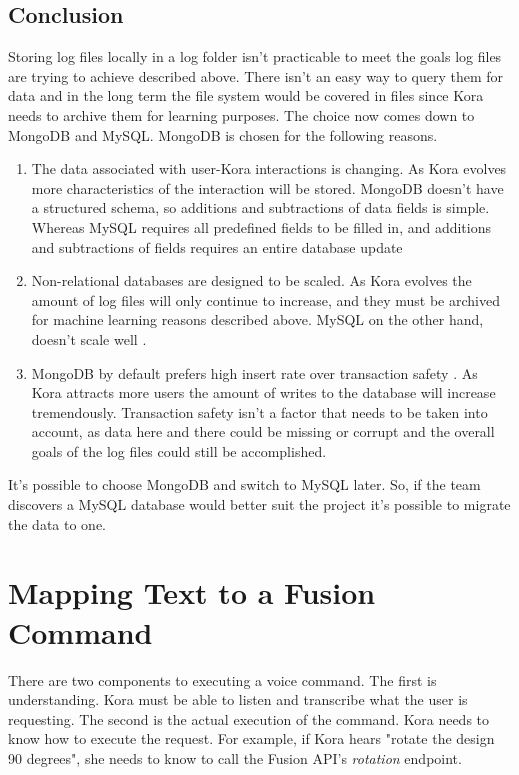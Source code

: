\documentclass[onecolumn, draftclsnofoot,10pt, compsoc]{IEEEtran}
\begin{document}
		\subsection{Conclusion}
			Storing log files locally in a log folder isn't practicable to meet the goals log files are trying to achieve described above.
			There isn't an easy way to query them for data and in the long term the file system would be covered in files since Kora needs to archive them for learning purposes.
			The choice now comes down to MongoDB and MySQL.
			MongoDB is chosen for the following reasons.
			\begin{enumerate}
				\item{
					The data associated with user-Kora interactions is changing.
					As Kora evolves more characteristics of the interaction will be stored.
					MongoDB doesn't have a structured schema, so additions and subtractions of data fields is simple.
					Whereas MySQL requires all predefined fields to be filled in, and additions and subtractions of fields requires an entire database update}
				\item{
					Non-relational databases are designed to be scaled.
					As Kora evolves the amount of log files will only continue to increase, and they must be archived for machine learning reasons described above. 
					MySQL on the other hand, doesn't scale well \cite{SQLvsNoSQLsitepoint}.}
				\item{
					MongoDB by default prefers high insert rate over transaction safety \cite{SQLvsNoSQLupwork}.
					As Kora attracts more users the amount of writes to the database will increase tremendously.
					Transaction safety isn't a factor that needs to be taken into account, as data here and there could be missing or corrupt and the overall goals of the log files could still be accomplished.}
			\end{enumerate}
			
			It's possible to choose MongoDB and switch to MySQL later.
			So, if the team discovers a MySQL database would better suit the project it's possible to migrate the data to one. 



	
	\section{Mapping Text to a Fusion Command}
			There are two components to executing a voice command. 
			The first is understanding.
			Kora must be able to listen and transcribe what the user is requesting.
			The second is the actual execution of the command.
			Kora needs to know how to execute the request. 
			For example, if Kora hears "rotate the design 90 degrees", she needs to know to call the Fusion API's \textit{rotation} endpoint.
			
\end{document}
